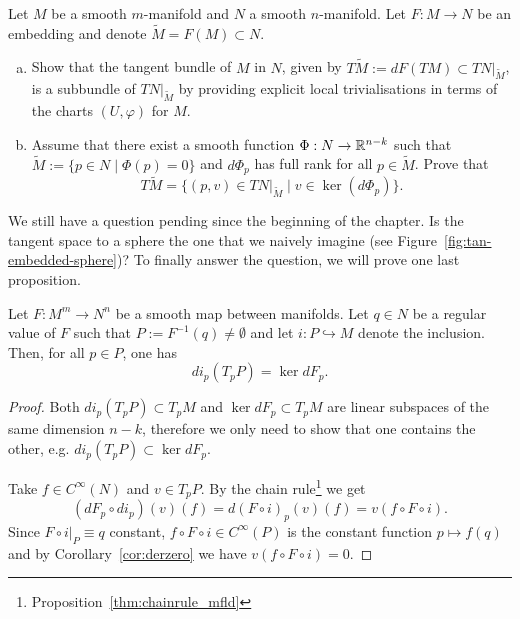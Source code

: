 \begin{exercise}[\textit{[homework 2]}]
  Let $M$ be a smooth $m$-manifold and $N$ a smooth $n$-manifold.
  Let $F:M\to N$ be an embedding and denote $\widetilde M = F(M)\subset N$.
  \begin{enumerate}[(a)]
    \item Show that the tangent bundle of $M$ in $N$, given by $T\widetilde M := dF(TM) \subset TN\Big|_{\widetilde M}$, is a subbundle of $TN\Big|_{\widetilde M}$ by providing explicit local trivialisations in terms of the charts $(U, \varphi)$ for $M$.
    \item Assume that there exist a smooth function $\Phi:N\to\mathbb{R}^{n-k}$ such that $\widetilde M := \{p\in N \mid \Phi(p) = 0\}$ and $d\Phi_p$ has full rank for all $p\in\widetilde M$. Prove that
    \begin{equation}
      T\widetilde{M} = \{(p,v)\in TN|_{\widetilde{M}} \mid v\in\ker(d\Phi_p)\}.
    \end{equation}
  \end{enumerate}
\end{exercise}

We still have a question pending since the beginning of the chapter.
Is the tangent space to a sphere the one that we naively imagine (see Figure~\ref{fig:tan-embedded-sphere})?
To finally answer the question, we will prove one last proposition.

\begin{proposition}
  Let $F:M^m\to N^n$ be a smooth map between manifolds.
  Let $q\in N$ be a regular value of $F$ such that $P:=F^{-1}(q)\neq\emptyset$ and let $i:P\hookrightarrow M$ denote the inclusion.
  Then, for all $p\in P$, one has
  \begin{equation}
    d i_p(T_p P) = \ker dF_p.
  \end{equation}
\end{proposition}
\begin{proof}
  Both $d i_p(T_p P)\subset T_p M$ and $\ker dF_p \subset T_p M$ are linear subspaces of the same dimension $n-k$, therefore we only need to show that one contains the other, e.g. $d i_p(T_p P) \subset \ker dF_p$.

  Take $f\in C^\infty(N)$ and $v\in T_p P$. By the chain rule\footnote{Proposition~\ref{thm:chainrule_mfld}} we get
  \begin{equation}
    (d F_p \circ d i_p)(v)(f) = d(F\circ i)_p(v)(f) = v(f\circ F\circ i).
  \end{equation}
  Since $F\circ i\big|_{P} \equiv q$ constant, $f\circ F\circ i\in C^\infty(P)$ is the constant function $p \mapsto f(q)$ and by Corollary~\ref{cor:derzero} we have $v(f\circ F\circ i)=0$.
\end{proof}

